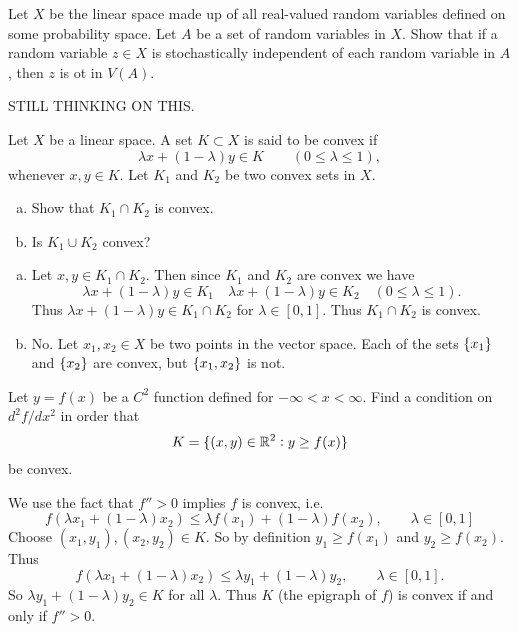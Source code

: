 \begin{problem}
	Let $ X $ be the linear space made up of all real-valued random variables defined on some probability space. Let $ A $ be a set of random variables in $ X $. Show that if a random variable $ z\in X $ is stochastically independent of each random variable in $ A $, then $ z $ is ot in $ V(A) $.
\end{problem}
\begin{solution}
	STILL THINKING ON THIS.
\end{solution}

\begin{problem}
	Let $ X $ be a linear space. A set $ K\subset X $ is said to be convex if
	\[ \lambda x + (1-\lambda)y \in K \qquad (0\leq \lambda \leq 1), \]
	whenever $ x,y\in K $. Let $ K_1 $ and $ K_2 $ be two convex sets in $ X $. 
	\begin{enumerate}[(a)]
		\item Show that $ K_1\cap K_2 $ is convex.
		\item Is $ K_1\cup K_2 $ convex?
	\end{enumerate}
\end{problem}
\begin{solution}
	\begin{enumerate}[(a)]
		\item Let $ x,y\in K_1\cap K_2 $. Then since $ K_1 $  and $ K_2 $ are convex we have
		\[ \lambda x + (1-\lambda)y \in K_1 \quad \lambda x + (1-\lambda)y \in K_2 \quad (0\leq \lambda \leq 1). \]
		Thus $ \lambda x + (1-\lambda) y \in K_1\cap K_2 $ for $ \lambda \in [0,1] $. Thus $ K_1\cap K_2 $ is convex.
		
		\item No. Let $ x_1,x_2 \in X $ be two points in the vector space. Each of the sets $ \{x_1\} $ and $ \{x_2\} $ are convex, but $ \{x_1,x_2\}$ is not.
	\end{enumerate}
\end{solution}

\begin{problem}
	Let $ y = f(x) $ be a $ C^2 $ function defined for $ -\infty < x <\infty $. Find a condition on $ d^2f/dx^2 $ in order that
	\[ K = \{(x,y)\in \mathbb{R}^2: y\geq f(x)\} \]
	be convex.
\end{problem}
\begin{solution}
	We use the fact that $ f''>0 $ implies $ f $ is convex, i.e. 
	\[ f(\lambda x_1 + (1-\lambda)x_2) \leq \lambda f(x_1) + (1-\lambda) f(x_2), \qquad \lambda\in [0,1] \]
	Choose $ (x_1,y_1),(x_2,y_2) \in K $. So by definition $ y_1 \geq f(x_1) $ and $ y_2 \geq f(x_2) $. Thus
	\[ f(\lambda x_1 + (1-\lambda)x_2) \leq \lambda y_1 + (1-\lambda) y_2, \qquad \lambda\in [0,1].  \]
	So $ \lambda y_1 + (1-\lambda) y_2 \in K  $ for all $ \lambda $. Thus $ K $ (the epigraph of $ f $) is convex if and only if $ f'' >0 $.
\end{solution}


